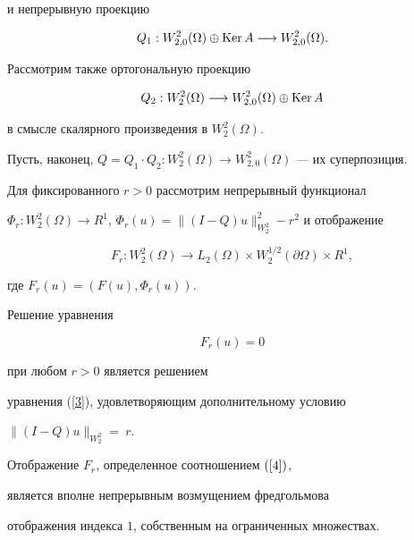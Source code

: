 и непрерывную проекцию


$$


Q_1 : W^2_{2,0}(\Omega)\oplus \Ker A\longrightarrow W^2_{2,0}(\Omega).


$$


Рассмотрим также ортогональную проекцию


$$


Q_2 : W^2_2(\Omega)\longrightarrow W^2_{2,0}(\Omega)\oplus \Ker A


$$


в смысле скалярного произведения в $W^2_2(\Omega)$.


Пусть, наконец, $Q=Q_1\cdot Q_2 : W^2_2(\Omega)\longrightarrow


W^2_{2,0}(\Omega)$ --- их суперпозиция.





Для фиксированного $r>0$ рассмотрим непрерывный функционал 


$\Phi_r : W^2_2(\Omega)\to R^1$, $\Phi_r(u)=


\|(I-Q)u\|^2_{W^2_2}-r^2$ и отображение


\begin{equation}


\label{4}


F_r : W^2_2(\Omega)\longrightarrow L_2(\Omega)\times 


W^{1/2}_2(\partial \Omega)\times R^1,


\end{equation}


где $F_r(u)=(F(u),\Phi_r(u))$.





Решение уравнения


\begin{equation}\label{r}


F_r(u)=0


\end{equation}


при любом $r>0$ является решением


уравнения (\ref{3}), удовлетворяющим дополнительному условию


$\|(I-Q)u\|_{W^2_2}=~r$.





\begin{lem}


\label{l1}


Отображение $F_r$, определенное соотношением $(\ref{4})$,


является вполне непрерывным возмущением фредгольмова


отображения индекса $1$, собственным на ограниченных множествах.


\end{lem}





